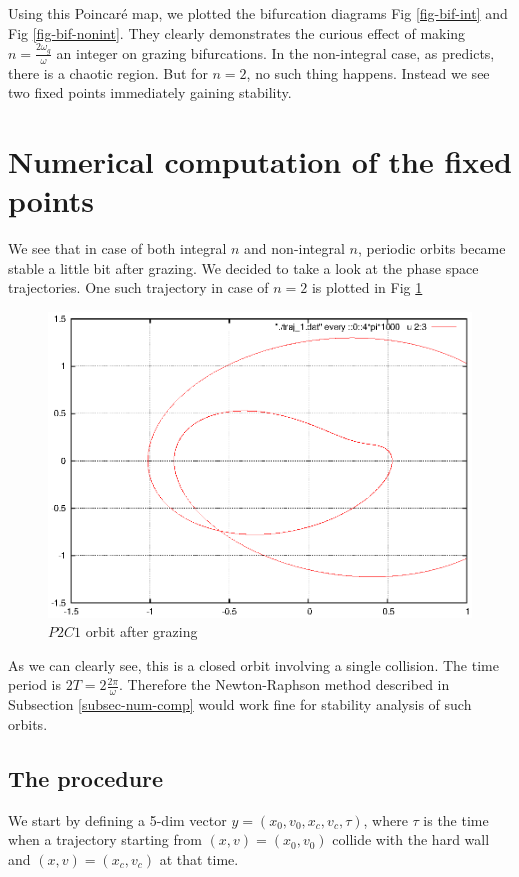 \documentclass{book}
\renewcommand{\(}{\begin{columns}}
\renewcommand{\)}{\end{columns}}
\newcommand{\<}[1]{\begin{column}{#1}}
\renewcommand{\>}{\end{column}}
\begin{document}
Using this Poincaré map, we plotted the bifurcation diagrams  Fig 
\ref{fig-bif-int} and Fig \ref{fig-bif-nonint}. They clearly demonstrates the 
curious effect of making $n=\frac{2\omega_g}{\omega}$ 
an integer on grazing bifurcations. In the non-integral case, as 
\cite{banerjee-kundu-soft,banerjee-kundu-hard} predicts, there is a chaotic 
region.  But for $n=2$, no such thing happens.  Instead we see two fixed 
points immediately gaining stability. 

\section{Numerical computation of the fixed points}
We see that in case of both integral $n$ and non-integral $n$,  periodic 
orbits became stable a little bit 
after grazing.  We decided to take a look at the phase 
space trajectories. One such trajectory in case of $n=2$ is plotted in Fig \ref{fig-traj-p2c1}
\begin{figure}[!htp]
\caption{$P2C1$ orbit after grazing}
\label{fig-traj-p2c1}
\begin{center}
\includegraphics[width=0.9\columnwidth]{after-grazing-p1-traj}
\end{center}
\end{figure}

As we can clearly see, this is a closed orbit involving a single collision.  
The time period is $2T=2\frac{2\pi}{\omega}$.  Therefore the Newton-Raphson 
method described in Subsection \ref{subsec-num-comp} would work fine for 
stability analysis of such orbits.  

\subsection{The procedure}
We start by defining a 5-dim vector $y=(x_0,v_0,x_c,v_c,\tau)$, where $\tau$ 
is the time when a trajectory starting from $(x,v)=(x_0,v_0)$ collide with the 
hard wall and $(x,v)=(x_c,v_c)$ at that time.  
\end{document}
